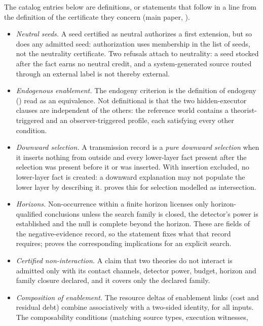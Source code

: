 The catalog entries below are definitions, or statements that follow in a line from the
definition of the certificate they concern (main paper, ).
\begin{itemize}
  \item \emph{Neutral seeds.} A seed certified as neutral authorizes a first extension,
        but so does any admitted seed: authorization uses membership in the list of seeds,
        not the neutrality certificate. Two refusals attach to neutrality: a seed stocked
        after the fact earns no neutral credit, and a system-generated source routed
        through an external label is not thereby external.
  \item \emph{Endogenous enablement.} The endogeny criterion is the definition of endogeny
        () read as an equivalence. Not definitional is that the two
        hidden-executor clauses are independent of the others: the reference world
        contains a theorist-triggered and an observer-triggered profile, each satisfying
        every other condition.
  \item \emph{Downward selection.} A transmission record is a \emph{pure downward
        selection} when it inserts nothing from outside and every lower-layer fact present
        after the selection was present before it or was inserted. With insertion
        excluded, no lower-layer fact is created: a downward explanation may not populate
        the lower layer by describing it.  proves this for selection
        modelled as intersection.
  \item \emph{Horizons.} Non-occurrence within a finite horizon licenses only
        horizon-qualified conclusions unless the search family is closed, the detector's
        power is established and the null is complete beyond the horizon. These are fields
        of the negative-evidence record, so the statement fixes what that record requires;
         proves the corresponding implications for an explicit search.
  \item \emph{Certified non-interaction.} A claim that two theories do not interact is
        admitted only with its contact channels, detector power, budget, horizon and family
        closure declared, and it covers only the declared family.
  \item \emph{Composition of enablement.} The resource deltas of enablement links (cost
        and residual debt) combine associatively with a two-sided identity, for all
        inputs. The composability conditions (matching source types, execution witnesses,

\end{itemize}
